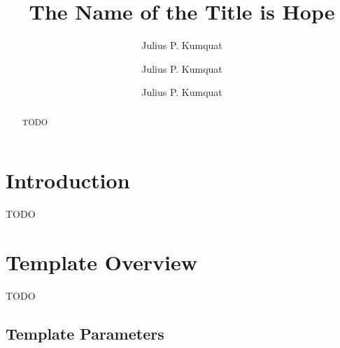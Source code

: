 \documentclass[sigconf]{acmart}
\begin{document}
\title{The Name of the Title is Hope}

\author{Julius P. Kumquat}

\author{Julius P. Kumquat}

\author{Julius P. Kumquat}

\begin{abstract}
TODO
\end{abstract}

\maketitle

\section{Introduction}
TODO

\section{Template Overview}
TODO

\subsection{Template Parameters}





\appendix
\end{document}
